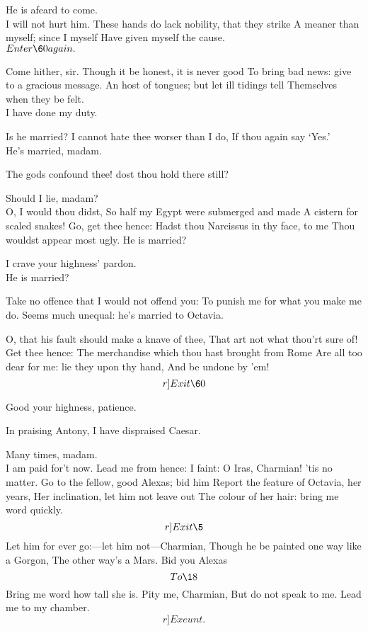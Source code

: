 \documentclass{book}
\begin{document}
\7	He is afeard to come. \\

\2	I will not hurt him.
	These hands do lack nobility, that they strike
	A meaner than myself; since I myself
	Have given myself the cause. \\

	\(Enter \60 again.\)

		       Come hither, sir.
	Though it be honest, it is never good
	To bring bad news: give to a gracious message.
	An host of tongues; but let ill tidings tell
	Themselves when they be felt.  \\

	I have done my duty.

\2	Is he married?
	I cannot hate thee worser than I do,
	If thou again say `Yes.' \\

	He's married, madam.

\2	The gods confound thee! dost thou hold there still?

	Should I lie, madam? \\

\2	O, I would thou didst,
	So half my Egypt were submerged and made
	A cistern for scaled snakes! Go, get thee hence:
	Hadst thou Narcissus in thy face, to me
	Thou wouldst appear most ugly. He is married?

	I crave your highness' pardon. \\

\2	He is married?

	Take no offence that I would not offend you:
	To punish me for what you make me do.
	Seems much unequal: he's married to Octavia.

\2	O, that his fault should make a knave of thee,
	That art not what thou'rt sure of! Get thee hence:
	The merchandise which thou hast brought from Rome
	Are all too dear for me: lie they upon thy hand,
	And be undone by 'em! 	\[r]Exit \60\]

\7	Good your highness, patience.

\2	In praising Antony, I have dispraised Caesar.

\7	Many times, madam. \\

\2	                  I am paid for't now.
	Lead me from hence:
	I faint: O Iras, Charmian! 'tis no matter.
	Go to the fellow, good Alexas; bid him
	Report the feature of Octavia, her years,
	Her inclination, let him not leave out
	The colour of her hair: bring me word quickly. \[r]Exit \5\]
	Let him for ever go:---let him not---Charmian,
	Though he be painted one way like a Gorgon,
	The other way's a Mars. Bid you Alexas
	\[To \18\] Bring me word how tall she is. Pity me, Charmian,
	But do not speak to me. Lead me to my chamber. 	\[r]Exeunt.\]
\end{document}
